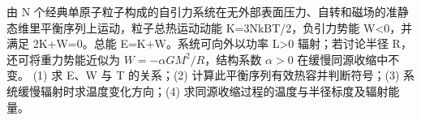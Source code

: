 由 N 个经典单原子粒子构成的自引力系统在无外部表面压力、自转和磁场的准静态维里平衡序列上运动，粒子总热运动动能 K=3NkBT/2，负引力势能 W<0，并满足 2K+W=0。总能 E=K+W。系统可向外以功率 L>0 辐射；若讨论半径 R，还可将重力势能近似为 \(W=-\alpha GM^{2}/R\)，结构系数 \(\alpha >0\) 在缓慢同源收缩中不变。
(1) 求 E、W 与 T 的关系；(2) 计算此平衡序列有效热容并判断符号；(3) 系统缓慢辐射时求温度变化方向；(4) 求同源收缩过程的温度与半径标度及辐射能量。
